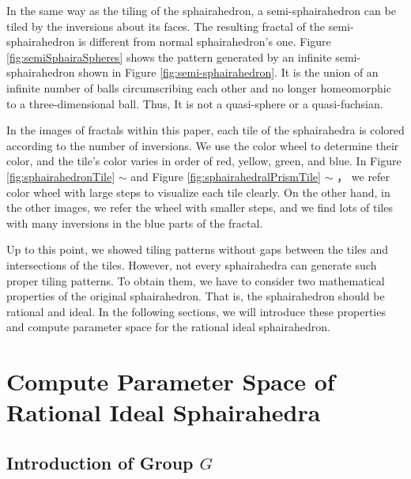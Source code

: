 \documentclass[suppldata, dvipdfmx]{interact}
\theoremstyle{plain}%
\theoremstyle{definition}
\theoremstyle{remark}
\theoremstyle{problemstyle}
\begin{document}
In the same way as the tiling of the sphairahedron, a semi-sphairahedron
can be tiled by the inversions about its faces.
The resulting fractal of the semi-sphairahedron is different from normal
sphairahedron's one.
Figure \ref{fig:semiSphairaSpheres} shows the pattern
generated by an infinite semi-sphairahedron shown in Figure 
\ref{fig:semi-sphairahedron}.
It is the union of an infinite number of balls
circumscribing each other and no longer homeomorphic
to a three-dimensional ball.
Thus, It is not a quasi-sphere or a quasi-fuchsian.

In the images of fractals within this paper, each tile of the
sphairahedra is colored according to the
number of inversions.
We use the color wheel to determine their color,
and the tile's color varies in order of red, yellow, green, and blue.
In Figure \ref{fig:sphairahedronTile} $\sim$  and
Figure \ref{fig:sphairahedralPrismTile} $\sim$ ，
we refer color wheel with large steps to visualize each tile clearly.
On the other hand, in the other images, we refer the wheel with smaller
steps, and we find lots of tiles with many inversions in the blue
parts of the fractal.

Up to this point, we showed tiling patterns without gaps between the tiles and
intersections of the tiles.
However, not every sphairahedra can generate such proper tiling patterns.
To obtain them, we have to consider two mathematical properties
of the original sphairahedron. That is, the sphairahedron should be
rational and ideal.
In the following sections, we will introduce these properties and
compute parameter space for the rational ideal sphairahedron.


\section{Compute Parameter Space of Rational Ideal Sphairahedra}

\subsection{Introduction of Group $G$}
\end{document}
